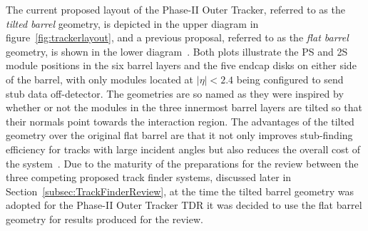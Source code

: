 The current proposed layout of the Phase-II Outer Tracker, referred to as the \emph{tilted barrel} geometry, is depicted in the upper diagram in figure~\ref{fig:trackerlayout}, and a previous proposal, referred to as the \emph{flat barrel} geometry, is shown in the lower diagram~\cite{CMS_Upgrade_TP}.
Both plots illustrate the PS and 2S module positions in the six barrel layers and the five endcap disks on either side of the barrel, with only modules located at $|\eta| < 2.4$ being configured to send stub data off-detector.
The geometries are so named as they were inspired by whether or not the modules in the three innermost barrel layers are tilted so that their normals point towards the interaction region.
The advantages of the tilted geometry over the original flat barrel are that it not only improves stub-finding efficiency for tracks with large incident angles but also reduces the overall cost of the system~\cite{P2TrackerTDR}.
Due to the maturity of the preparations for the review between the three competing proposed track finder systems, discussed later in Section~\ref{subsec:TrackFinderReview}, at the time the tilted barrel geometry was adopted for the Phase-II Outer Tracker TDR it was decided to use the flat barrel geometry for results produced for the review.

